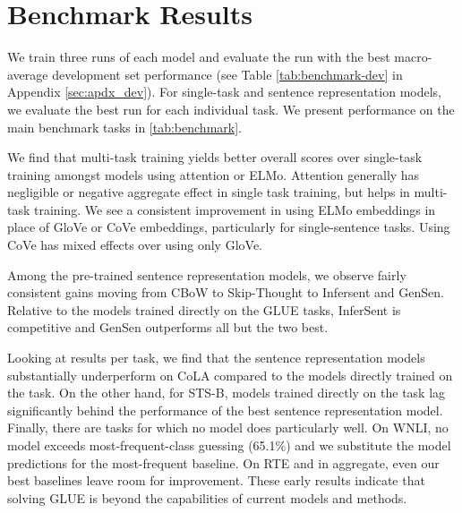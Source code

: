 \begin{table*}[t]
\begin{tabular}{lrrrrrrrrrr}
\bottomrule
\end{tabular}
\caption{Baseline performance on the GLUE task test sets. 
For MNLI, we report accuracy on the matched and mismatched test sets. For MRPC and Quora, we report accuracy and F1. For STS-B, we report Pearson and Spearman correlation. For CoLA, we report Matthews correlation. For all other tasks we report accuracy. All values are scaled by 100.
A similar table is presented on the online platform. %
}
\label{tab:benchmark}
\end{table*}

\section{Benchmark Results}\label{sec:experiments}

We train three runs of each model and evaluate the run with the best macro-average development set performance (see Table \ref{tab:benchmark-dev} in Appendix \ref{sec:apdx_dev}). For single-task and sentence representation models, we evaluate the best run for each individual task. We present performance on the main benchmark tasks in \autoref{tab:benchmark}. 

We find that multi-task training yields better overall scores over single-task training amongst models using attention or ELMo.
Attention generally has negligible or negative aggregate effect in single task training, but helps in multi-task training.
We see a consistent improvement in using ELMo embeddings in place of GloVe or CoVe embeddings, particularly for single-sentence tasks.
Using CoVe has mixed effects over using only GloVe.

Among the pre-trained sentence representation models, we observe fairly consistent gains moving from CBoW to Skip-Thought to Infersent and GenSen.
Relative to the models trained directly on the GLUE tasks, InferSent is competitive and GenSen outperforms all but the two best.

Looking at results per task, we find that the sentence representation models substantially underperform on CoLA compared to the models directly trained on the task. 
On the other hand, for STS-B, models trained directly on the task lag significantly behind the performance of the best sentence representation model.
Finally, there are tasks for which no model does particularly well. On WNLI, no model exceeds most-frequent-class guessing (65.1\%) and we substitute the model predictions for the most-frequent baseline. On RTE and in aggregate, even our best baselines leave room for improvement.
These early results indicate that solving GLUE is beyond the capabilities of current models and methods.

